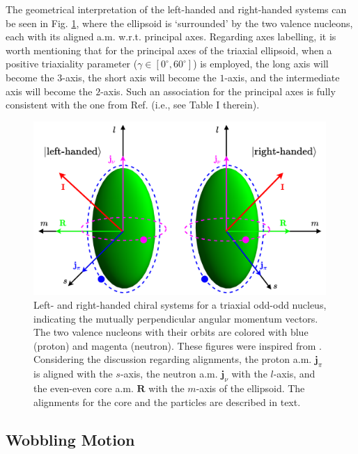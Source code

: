 The geometrical interpretation of the left-handed and right-handed systems can be seen in Fig. \ref{chiral-geometry}, where the ellipsoid is `surrounded' by the two valence nucleons, each with its aligned a.m. w.r.t. principal axes. Regarding axes labelling, it is worth mentioning that for the principal axes of the triaxial ellipsoid, when a positive triaxiality parameter ($\gamma\in[0^\circ,60^\circ]$) is employed, the long axis will become the $3$-axis, the short axis will become the $1$-axis, and the intermediate axis will become the $2$-axis. Such an association for the principal axes is fully consistent with the one from Ref. \cite{frauendorf2001spontaneous} (i.e., see Table I therein).

\begin{figure}
    \centering
    \includegraphics[width=0.99\textwidth]{Chapters/Figures/chiral_handedness.pdf}
    \caption{Left- and right-handed chiral systems for a triaxial odd-odd nucleus, indicating the mutually perpendicular angular momentum vectors. The two valence nucleons with their orbits are colored with blue (proton) and magenta (neutron). These figures were inspired from \cite{starosta2001chiral}. Considering the discussion regarding alignments, the proton a.m. $\mathbf{j}_\pi$ is aligned with the $s$-axis, the neutron a.m. $\mathbf{j}_\nu$ with the $l$-axis, and the even-even core a.m. $\mathbf{R}$ with the $m$-axis of the ellipsoid. The alignments for the core and the particles are described in text.}
    \label{chiral-geometry}
\end{figure}

\subsection{Wobbling Motion}

